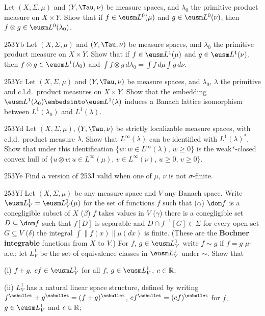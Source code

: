 {
Let $(X,\Sigma,\mu)$ and $(Y,\Tau,\nu)$ be measure spaces, and
$\lambda_0$ the primitive product measure on $X\times Y$.  Show that if
$f\in\eusm L^0(\mu)$ and $g\in\eusm L^0(\nu)$, then
$f\otimes g\in\eusm L^0(\lambda_0)$.

\spheader 253Yb Let $(X,\Sigma,\mu)$ and
$(Y,\Tau,\nu)$ be measure spaces, and $\lambda_0$ the primitive
product measure on $X\times Y$.   Show that if $f\in\eusm L^1(\mu)$ and
$g\in\eusm L^1(\nu)$, then $f\otimes g\in\eusm L^1(\lambda_0)$ and
$\int f\otimes g\,d\lambda_0=\int f\,d\mu\int g\,d\nu$.

\spheader 253Yc Let $(X,\Sigma,\mu)$ and $(Y,\Tau,\nu)$ be
measure spaces, and $\lambda_0$, $\lambda$ the primitive and c.l.d.\
product measures on $X\times Y$.   Show that the embedding 
$\eusm L^1(\lambda_0)\embedsinto\eusm L^1(\lambda)$
induces a Banach lattice isomorphism between $L^1(\lambda_0)$ and
$L^1(\lambda)$.

\spheader 253Yd Let $(X,\Sigma,\mu)$, $(Y,\Tau,\nu)$ be strictly
localizable measure spaces, with c.l.d.\ product measure $\lambda$.
Show that $L^{\infty}(\lambda)$ can be identified with $L^1(\lambda)^*$.
Show that under this identification
$\{w:w\in L^{\infty}(\lambda),\,w\ge 0\}$ is the weak*-closed convex hull of
$\{u\otimes v:u\in L^{\infty}(\mu),\,v\in L^{\infty}(\nu),
\,u\ge 0,\,v\ge 0\}$.

\spheader 253Ye Find a version of 253J valid when one of $\mu$, $\nu$
is not $\sigma$-finite.

\spheader 253Yf Let $(X,\Sigma,\mu)$ be any measure space and $V$ any
Banach space.   Write $\eusm L^1_V=\eusm L^1_V(\mu)$ for the set of
functions $f$
such that ($\alpha$) $\dom f$ is a conegligible subset of $X$ ($\beta$)
$f$ takes values in $V$ ($\gamma$) there is a conegligible set
$D\subseteq\dom
f$ such that $f[D]$ is separable and $D\cap f^{-1}[G]\in\Sigma$ for
every open set $G\subseteq V$ ($\delta$) the integral
$\int\|f(x)\|\mu(dx)$ is finite.   (These are the {\bf Bochner
integrable} functions from $X$ to
$V$.)   For $f$, $g\in\eusm L^1_V$ write $f\sim g$ if
$f=g\,\,\mu$-a.e.;  let $L^1_V$ be the set of equivalence classes
in $\eusm L^1_V$ under $\sim$.   Show that

\quad (i) $f+g$, $cf\in\eusm L^1_V$ for all $f$, 
$g\in\eusm L^1_V$, $c\in\Bbb R$;

\quad (ii) $L^1_V$ has a natural linear space structure, defined by
writing $f^{\ssbullet}+g^{\ssbullet}=(f+g)^{\ssbullet}$,
$cf^{\ssbullet}=(cf)^{\ssbullet}$ for $f$, $g\in\eusm L^1_V$ and
$c\in\Bbb R$;

}
